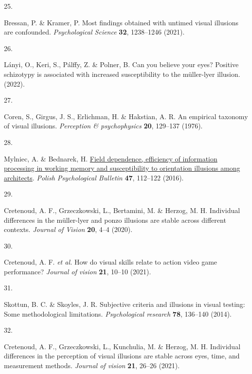 \documentclass[
  man,floatsintext]{apa6}
\newlength{\cslhangindent}
\newlength{\csllabelwidth}
\newlength{\cslentryspacingunit} %
\newenvironment{CSLReferences}[2] %
 {%
  \setlength{\parindent}{0pt}
  \ifodd #1
  \let\oldpar\par
  \def\par{\hangindent=\cslhangindent\oldpar}
  \fi
  \setlength{\parskip}{#2\cslentryspacingunit}
 }%
 {}
\newcommand{\CSLLeftMargin}[1]{\parbox[t]{\csllabelwidth}{#1}}
\newcommand{\CSLRightInline}[1]{\parbox[t]{\linewidth - \csllabelwidth}{#1}\break}
\begin{document}
\begin{CSLReferences}{0}{0}
\leavevmode{}%
\CSLLeftMargin{25. }%
\CSLRightInline{Bressan, P. \& Kramer, P. Most findings obtained with untimed visual illusions are confounded. \emph{Psychological Science} \textbf{32}, 1238--1246 (2021).}

\leavevmode{}%
\CSLLeftMargin{26. }%
\CSLRightInline{Lányi, O., Keri, S., Pálffy, Z. \& Polner, B. Can you believe your eyes? Positive schizotypy is associated with increased susceptibility to the m{ü}ller-lyer illusion. (2022).}

\leavevmode{}%
\CSLLeftMargin{27. }%
\CSLRightInline{Coren, S., Girgus, J. S., Erlichman, H. \& Hakstian, A. R. An empirical taxonomy of visual illusions. \emph{Perception \& psychophysics} \textbf{20}, 129--137 (1976).}

\leavevmode{}%
\CSLLeftMargin{28. }%
\CSLRightInline{Mylniec, A. \& Bednarek, H. \href{https://doi.org/10.1515/ppb-2016-0012}{Field dependence, efficiency of information processing in working memory and susceptibility to orientation illusions among architects}. \emph{Polish Psychological Bulletin} \textbf{47}, 112--122 (2016).}

\leavevmode{}%
\CSLLeftMargin{29. }%
\CSLRightInline{Cretenoud, A. F., Grzeczkowski, L., Bertamini, M. \& Herzog, M. H. Individual differences in the m{ü}ller-lyer and ponzo illusions are stable across different contexts. \emph{Journal of Vision} \textbf{20}, 4--4 (2020).}

\leavevmode{}%
\CSLLeftMargin{30. }%
\CSLRightInline{Cretenoud, A. F. \emph{et al.} How do visual skills relate to action video game performance? \emph{Journal of vision} \textbf{21}, 10--10 (2021).}

\leavevmode{}%
\CSLLeftMargin{31. }%
\CSLRightInline{Skottun, B. C. \& Skoyles, J. R. Subjective criteria and illusions in visual testing: Some methodological limitations. \emph{Psychological research} \textbf{78}, 136--140 (2014).}

\leavevmode{}%
\CSLLeftMargin{32. }%
\CSLRightInline{Cretenoud, A. F., Grzeczkowski, L., Kunchulia, M. \& Herzog, M. H. Individual differences in the perception of visual illusions are stable across eyes, time, and measurement methods. \emph{Journal of vision} \textbf{21}, 26--26 (2021).}


\end{CSLReferences}
\end{document}
